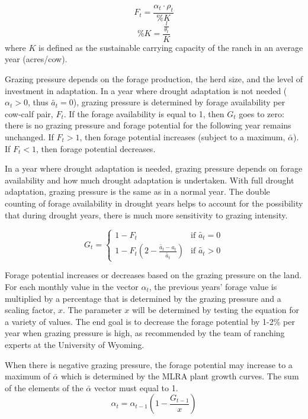 \documentclass[11pt]{article}
\begin{document}
\begin{equation}
F_t = \frac{\alpha_t \cdot \rho_t}{\%K}
\end{equation}
\begin{equation}
\%K = \frac{\frac{l}{\theta_t}}{K}
\end{equation}
where $K$ is defined as the sustainable carrying capacity of the ranch in an average year (acres/cow).



Grazing pressure depends on the forage production, the herd size, and the level of investment in adaptation. In a year where drought adaptation is not needed ($\alpha_t > 0$, thus $\tilde{a_t} = 0$), grazing pressure is determined by forage availability per cow-calf pair, $F_t$. If the forage availability is equal to 1, then $G_t$ goes to zero: there is no grazing pressure and forage potential for the following year remains unchanged. If $F_t > 1$, then forage potential increases (subject to a maximum, $\bar{\alpha}$). If $F_t < 1$, then forage potential decreases. 

In a year where drought adaptation is needed, grazing pressure depends on forage availability and how much drought adaptation is undertaken. With full drought adaptation, grazing pressure is the same as in a normal year. The double counting of forage availability in drought years helps to account for the possibility that during drought years, there is much more sensitivity to grazing intensity.  

\begin{equation}
G_t = 
\begin{cases}
1 - F_t & \text{if } \tilde{a_t} = 0 \\
1 - F_t(2 - \frac{\tilde{a_t} - a_t}{\tilde{a_t}}) & \text{if } \tilde{a_t} > 0  
\end{cases}
\end{equation}

Forage potential increases or decreases based on the grazing pressure on the land. For each monthly value in the vector $\alpha_{t}$, the previous years' forage value is multiplied by a percentage that is determined by the grazing pressure and a scaling factor, $x$. The parameter $x$ will be determined by testing the equation for a variety of values. The end goal is to decrease the forage potential by 1-2\% per year when grazing pressure is high, as recommended by the team of ranching experts at the University of Wyoming. 

When there is negative grazing pressure, the forage potential may increase to a maximum of $\bar{\alpha}$ which is determined by the MLRA plant growth curves. The sum of the elements of the $\bar{\alpha}$ vector must equal to 1.
\begin{equation}
\alpha_t = \alpha_{t-1} \left(1 - \frac{G_{t-1}}{x}\right)
\end{equation}
\end{document}
